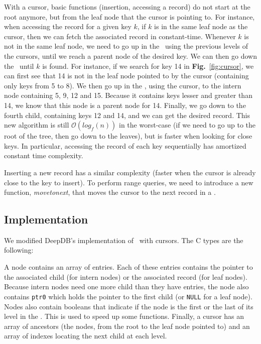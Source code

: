 \cursor

With a cursor, basic functions (insertion, accessing a record) do not start at the root anymore, but from the leaf node that the cursor is pointing to.
For instance, when accessing the record for a given key $k$, if $k$ is in the same leaf node as the cursor, then we can fetch the associated record in constant-time.
Whenever $k$ is not in the same leaf node, we need to go up in the \btree\ using the previous levels of the cursors, until we reach a parent node of the desired key.
We can then go down the \btree\ until $k$ is found.
For instance, if we search for key 14 in \textbf{Fig.}~\ref{fig:cursor}, we can first see that 14 is not in the leaf node pointed to by the cursor (containing only keys from 5 to 8).
We then go up in the \btree, using the cursor, to the intern node containing 5, 9, 12 and 15.
Because it contains keys lesser and greater than 14, we know that this node is a parent node for 14.
Finally, we go down to the fourth child, containing keys 12 and 14, and we can get the desired record.
This new algorithm is still $\mathcal{O}(log_{f}(n))$ in the worst-case (if we need to go up to the root of the tree, then go down to the leaves),
but is faster when looking for close keys.
In particular, accessing the record of each key sequentially has amortized constant time complexity.

Inserting a new record has a similar complexity (faster when the cursor is already close to the key to insert).
To perform range queries, we need to introduce a new function, \textit{movetonext}, that moves the cursor to the next record in a \btree.

\subsection{Implementation}
We modified DeepDB's implementation of \btrees\ with cursors. The C types are the following:

\begin{multicols}{2}

\end{multicols}

A node contains an array of entries.
Each of these entries contains the pointer to the associated child (for intern nodes) or the associated record (for leaf nodes).
Because intern nodes need one more child than they have entries, the node also contains \texttt{ptr0} which holds the pointer to the first child (or \texttt{NULL} for a leaf node).
Nodes also contain booleans that indicate if the node is the first or the last of its level in the \btree.
This is used to speed up some functions.
Finally, a cursor has an array of ancestors (the nodes, from the root to the leaf node pointed to) and an array of indexes locating the next child at each level.

